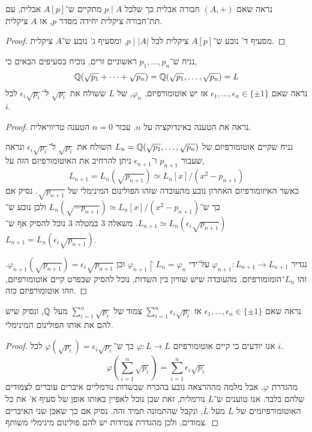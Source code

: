 \subquestion{}
נראה שאם $(A, +)$ חבורה אבלית כך שלכל $p \mid A$ מתקיים ש־$A[p]$ אבלית, עם תת־חבורה ציקלית יחידה מסדר $p$, אז $A$ ציקלית.
\begin{proof}
	מסעיף ד' נובע ש־$A[p]$ ציקלית לכל $p \mid |A|$, ומסעיף ג' נובע ש־$A$ ציקלית.
\end{proof}

\question{}
נניח ש־$p_1, \ldots, p_n$ ראשוניים זרים, נוכיח בסעיפים הבאים כי,
\[
	\mathbb{Q}(\sqrt{p_1} + \cdots + \sqrt{p_n})
	= \mathbb{Q}(\sqrt{p_1}, \ldots, \sqrt{p_n}) = L
\]
\subquestion{}
נראה שאם $\epsilon_1, \ldots, \epsilon_n \in \{ \pm 1 \}$ אז יש אוטומורפיזם, $\varphi_n$, של $L$ ששולח את $\sqrt{p_i}$ ל־$\epsilon_i \sqrt{p_i}$ לכל $i$.
\begin{proof}
	נראה את הטענה באינדוקציה על $n$.
	עבור $n = 0$ הטענה טריוויאלית.

	נניח שקיים אוטומורפיזם של $L_n = \mathbb{Q}(\sqrt{p_1}, \ldots, \sqrt{p_n})$ השולח את $\sqrt{p_i}$ ל־$\epsilon_i \sqrt{p_i}$ ונראה שעבור $p_{n + 1}$ ו־$\epsilon_{n + 1}$ ניתן להרחיב את האוטומורפיזם הזה על,
	\[
		L_{n + 1} = L_n(\sqrt{p_{n + 1}})
		\simeq L_n[x] / (x^2 - p_{n + 1})
	\]
	כאשר האיזומורפיזם האחרון נובע מהעובדה שזהו הפולינום המינימלי של $\sqrt{p_{n + 1}}$.
	נסיק אם כך ש־$L_n(\sqrt{- p_{n + 1}}) \simeq L_n[x] / (x^2 - p_{n + 1})$ ולכן נובע ש־$L_{n + 1} \simeq L_n(\epsilon_i \sqrt{p_{n + 1}})$.
	משאלה 3 במטלה 3 נוכל להסיק אף ש־$L_{n + 1} = L_n(\epsilon_i \sqrt{p_{n + 1}})$.

	נגדיר $\varphi_{n + 1} : L_{n + 1} \to L_{n + 1}$ על־ידי $\varphi_{n + 1} \restriction L_n = \varphi_n$ וכן $\varphi_{n + 1}(\sqrt{p_{n + 1}}) = \epsilon_i \sqrt{p_{n + 1}}$.
	זהו $L_n$־הומומורפיזם.
	מהעובדה שיש שוויון בין השדות, נוכל להסיק שבפרט קיים אוטומורפיזם, וזהו אוטומורפיזם כזה.
\end{proof}

\subquestion{}
נראה שאם $\epsilon_1, \ldots, \epsilon_n \in \{ \pm 1 \}$ אז $\sum_{i = 1}^n \epsilon_i \sqrt{p_i}$ צמוד של $\sum_{i = 1}^n \sqrt{p_i}$ מעל $\mathbb{Q}$,
ונסיק שיש להם את אותו הפולינום המינימלי.
\begin{proof}
	אנו יודעים כי קיים אוטומורפיזם $\varphi : L \to L$ כך ש־$\varphi(\sqrt{p_i}) = \epsilon_i \sqrt{p_i}$ לכל $i$.
	\[
		\varphi\left(\sum_{i = 1}^n \sqrt{p_i}\right)
		= \sum_{i = 1}^n \epsilon_i \sqrt{p_i}
	\]
	מהגדרת $\varphi$.
	אבל מלמה מההרצאה נובע בהכרח שבשדות נורמליים איברים עוברים לצמודים שלהם בלבד.
	אנו טוענים ש־$L$ נורמלית, זאת שכן נוכל לאפיין באותו אופן של סעיף א' את כל האוטומורפיזמים של $L$ מעל $\overline{L}$, ונקבל שהתמונה תמיד זהה.
	נסיק אם כך שאכן שני האיברים צמודים, ולכן מהגדרת צמידות יש להם פולינום מינימלי משותף.
\end{proof}

